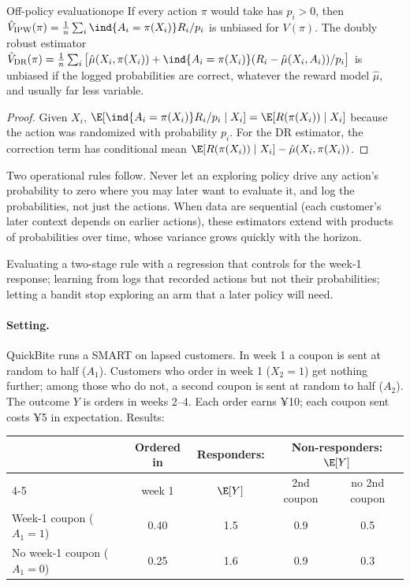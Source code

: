 \documentclass[11pt]{article}
\begin{document}
\begin{prop}{Off-policy evaluation}{ope}
If every action $\pi$ would take has $p_i > 0$, then $\hat V_{\text{IPW}}(\pi) = \frac1n\sum_i \ind{A_i = \pi(X_i)}R_i/p_i$ is unbiased for
$V(\pi)$. The doubly robust estimator
$\hat V_{\text{DR}}(\pi) = \frac1n\sum_i\big[\hat\mu(X_i, \pi(X_i)) + \ind{A_i = \pi(X_i)}(R_i - \hat\mu(X_i, A_i))/p_i\big]$ is unbiased if the logged
probabilities are correct, whatever the reward model $\hat\mu$, and usually far less variable.
\end{prop}
\begin{proof}
Given $X_i$, $\E[\ind{A_i = \pi(X_i)}R_i/p_i \mid X_i] = \E[R(\pi(X_i)) \mid X_i]$ because the action was randomized with probability
$p_i$. For the DR estimator, the correction term has conditional mean $\E[R(\pi(X_i)) \mid X_i] - \hat\mu(X_i, \pi(X_i))$.
\end{proof}

Two operational rules follow. Never let an exploring policy drive any action's probability to zero where you may later want
to evaluate it, and log the probabilities, not just the actions. When data are sequential (each customer's later context
depends on earlier actions), these estimators extend with products of probabilities over time, whose variance grows quickly
with the horizon.

\begin{pitfall}
Evaluating a two-stage rule with a regression that controls for the week-1 response; learning from logs that recorded
actions but not their probabilities; letting a bandit stop exploring an arm that a later policy will need.
\end{pitfall}

\sectiontwo

\paragraph{Setting.} QuickBite runs a SMART on lapsed customers. In week 1 a coupon is sent at random to half ($A_1$). Customers
who order in week 1 ($X_2 = 1$) get nothing further; among those who do not, a second coupon is sent at random to half ($A_2$).
The outcome $Y$ is orders in weeks 2--4. Each order earns ¥10; each coupon sent costs ¥5 in expectation. Results:
\begin{center}
\begin{tabular}{lcccc}
\toprule
& Ordered in & Responders: & \multicolumn{2}{c}{Non-responders: $\E[Y]$} \\
\cmidrule(lr){4-5}
& week 1 & $\E[Y]$ & 2nd coupon & no 2nd coupon \\
\midrule
Week-1 coupon ($A_1 = 1$) & 0.40 & 1.5 & 0.9 & 0.5 \\
No week-1 coupon ($A_1 = 0$) & 0.25 & 1.6 & 0.9 & 0.3 \\
\bottomrule
\end{tabular}
\end{center}
\end{document}
